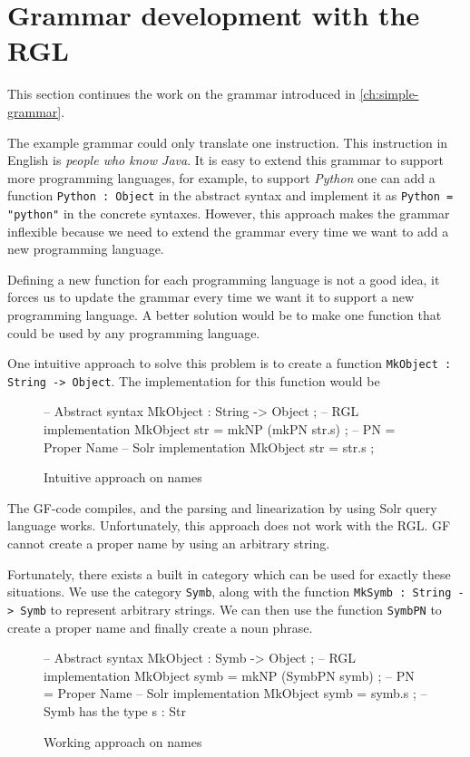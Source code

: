 \section{Grammar development with the RGL}
This section continues the work on the grammar introduced in \autoref{ch:simple-grammar}.

The example grammar could only translate one instruction. This instruction in English is \emph{people who know Java}. It is easy to extend this grammar to support more programming languages, for example, to support \emph{Python} one can add a function \texttt{Python : Object} in the abstract syntax and implement it as \texttt{Python = "python"} in the concrete syntaxes. However, this approach makes the grammar inflexible because we need to extend the grammar every time we want to add a new programming language.

Defining a new function for each programming language is not a good idea, it forces us to update the grammar every time we want it to support a new programming language. A better solution would be to make one function that could be used by any programming language.

One intuitive approach to solve this problem is to create a function \texttt{MkObject : String -> Object}. The implementation for this function would be 
\begin{figure}[H]
\begin{code}
-- Abstract syntax
MkObject : String -> Object ;
-- RGL implementation
MkObject str = mkNP (mkPN str.s) ; -- PN = Proper Name
-- Solr implementation
MkObject str = str.s ;
\end{code}
\caption{Intuitive approach on names}
\end{figure}

The GF-code compiles, and the parsing and linearization by using Solr query language works. Unfortunately, this approach does not work with the RGL. GF cannot create a proper name by using an arbitrary string. 

Fortunately, there exists a built in category which can be used for exactly these situations. We use the category \texttt{Symb}, along with the function \texttt{MkSymb : String -> Symb} to represent arbitrary strings. We can then use the function \texttt{SymbPN} to create a proper name and finally create a noun phrase.
\begin{figure}[H]
\begin{code}
-- Abstract syntax
MkObject : Symb -> Object ;
-- RGL implementation
MkObject symb = mkNP (SymbPN symb) ; -- PN = Proper Name
-- Solr implementation
MkObject symb = symb.s ; -- Symb has the type { s : Str }
\end{code}
\caption{Working approach on names}
\end{figure}

